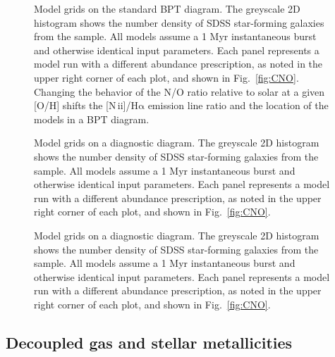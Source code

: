 \documentclass[preprint2]{aastex61}
\newcommand{\nii}{[N\,{\sc ii}]\xspace}
\newcommand{\ha}{\ensuremath{\mathrm{H\alpha}}\xspace}
\begin{document}
\begin{figure}
  \begin{center}
    \caption{Model grids on the standard BPT diagram. The greyscale 2D histogram shows the number density of SDSS star-forming galaxies from the \citet{Telford+2016} sample. All models assume a 1 Myr instantaneous burst and otherwise identical input parameters. Each panel represents a model run with a different abundance prescription, as noted in the upper right corner of each plot, and shown in Fig.~\ref{fig:CNO}. Changing the behavior of the N/O ratio relative to solar at a given [O/H] shifts the \nii/\ha emission line ratio and the location of the models in a BPT diagram.}
    \label{fig:BPT1}
  \end{center}
\end{figure}
\begin{figure}
  \begin{center}
    \caption{Model grids on a diagnostic diagram. The greyscale 2D histogram shows the number density of SDSS star-forming galaxies from the \citet{Telford+2016} sample. All models assume a 1 Myr instantaneous burst and otherwise identical input parameters. Each panel represents a model run with a different abundance prescription, as noted in the upper right corner of each plot, and shown in Fig.~\ref{fig:CNO}.}
    \label{fig:BPT2}
  \end{center}
\end{figure}
\begin{figure}
  \begin{center}
    \caption{Model grids on a diagnostic diagram. The greyscale 2D histogram shows the number density of SDSS star-forming galaxies from the \citet{Telford+2016} sample. All models assume a 1 Myr instantaneous burst and otherwise identical input parameters. Each panel represents a model run with a different abundance prescription, as noted in the upper right corner of each plot, and shown in Fig.~\ref{fig:CNO}.}
    \label{fig:BPT3}
  \end{center}
\end{figure}


\subsection{Decoupled gas and stellar metallicities}
\end{document}

